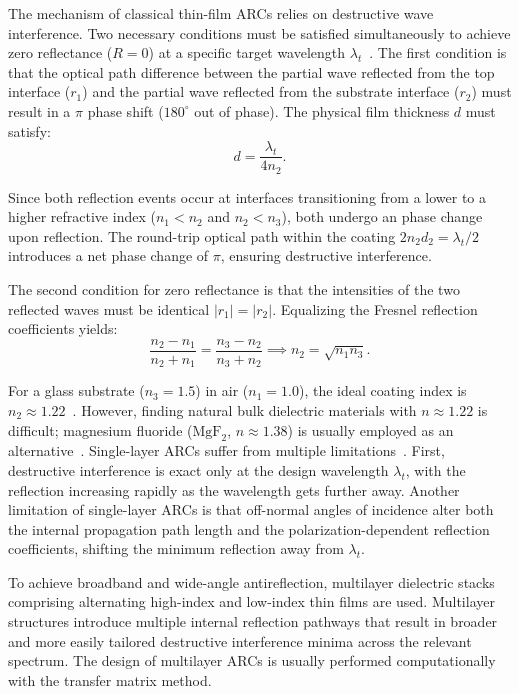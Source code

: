 The mechanism of classical thin-film \gls{ARC}s relies on destructive wave interference. Two necessary conditions must be satisfied simultaneously to achieve zero reflectance ($R = 0$) at a specific target wavelength $\lambda_t$~\cite{baisnabChapter7Short2021}. The first condition is that the optical path difference between the partial wave reflected from the top interface ($r_1$) and the partial wave reflected from the substrate interface ($r_2$) must result in a $\pi$ phase shift ($180^\circ$ out of phase). The physical film thickness $d$ must satisfy:
\begin{equation} \label{eqn: film_thickness}
		d = \frac{\lambda_t}{4 n_2}.
\end{equation}

Since both reflection events occur at interfaces transitioning from a lower to a higher refractive index ($n_1 < n_2$ and $n_2 < n_3$), both undergo an phase change upon reflection. The round-trip optical path within the coating $2 n_2 d_2 = {\lambda_t}/{2}$ introduces a net phase change of $\pi$, ensuring destructive interference.

The second condition for zero reflectance is that the intensities of the two reflected waves must be identical $\vert{}r_1\vert{} = \vert{}r_2\vert{}$. Equalizing the Fresnel reflection coefficients yields:
\begin{equation} \label{eqn: index_single}
		\frac{n_2 - n_1}{n_2 + n_1} = \frac{n_3 - n_2}{n_3 + n_2} \implies n_2 = \sqrt{n_1 n_3}.
\end{equation}

For a glass substrate ($n_3 = 1.5$) in air ($n_1 = 1.0$), the ideal coating index is $n_2 \approx 1.22$~\cite{hedayatiAntireflectiveCoatingsConventional2016}. However, finding natural bulk dielectric materials with $n \approx 1.22$ is difficult; magnesium fluoride ($\text{MgF}_2$, $n \approx 1.38$) is usually employed as an alternative~\cite{khanFabricationCharacterizationMgF22024}. Single-layer \gls{ARC}s suffer from multiple limitations~\cite{jestin126DownShiftingIncident2012}. First, destructive interference is exact only at the design wavelength $\lambda_t$, with the reflection increasing rapidly as the wavelength gets further away. Another limitation of single-layer \gls{ARC}s is that off-normal angles of incidence alter both the internal propagation path length and the polarization-dependent reflection coefficients, shifting the minimum reflection away from $\lambda_t$.

To achieve broadband and wide-angle antireflection, multilayer dielectric stacks comprising alternating high-index and low-index thin films are used. Multilayer structures introduce multiple internal reflection pathways that result in broader and more easily tailored destructive interference minima across the relevant spectrum. The design of multilayer \gls{ARC}s is usually performed computationally with the transfer matrix method\cite{sharhanTransferMatrixMathematical2020}.

